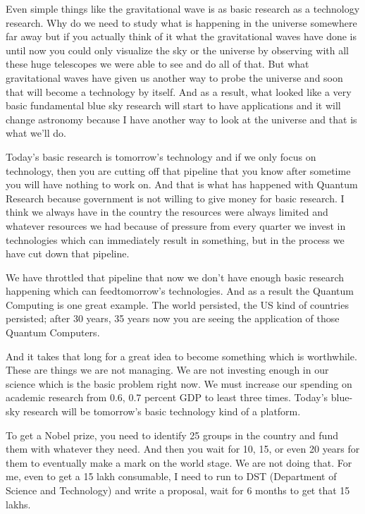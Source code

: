 \begin{multicols}{2}
Even simple things like the gravitational wave is as basic research as a technology research. Why do we need to study what is happening in the universe somewhere far away but if you actually think of it what the gravitational waves have done is until now you could only visualize the sky or the universe by observing with all these huge telescopes we were able to see and do all of that. But what gravitational waves have given us another way to probe the universe and soon that will become a technology by itself. And as a result, what looked like a very basic fundamental blue sky research will start to have applications and it will change astronomy because I have another way to look at the universe and that is what we’ll do.

Today’s basic research is tomorrow’s technology and if we only focus on technology, then you are cutting off that pipeline that you know after sometime you will have nothing to work on. And that is what has happened with Quantum Research because government is not willing to give money for basic research. I think we always have in the country the resources were always limited and whatever resources we had because of pressure from every quarter we invest in technologies which can immediately result in something, but in the process we have cut down that pipeline.

We have throttled that pipeline that now we don’t have enough basic research happening which can feed\break tomorrow’s technologies. And as a result the Quantum Computing is one great example. The world persisted, the US kind of countries persisted; after 30 years, 35 years now you are seeing the application of those Quantum Computers.

And it takes that long for a great idea to become something which is worthwhile. These are things we are not managing. We are not investing enough in our science which is the basic problem right now. We must increase our spending on academic research from 0.6, 0.7 percent GDP to least three times. Today’s blue-sky research will be tomorrow’s basic technology kind of a platform.

To get a Nobel prize, you need to identify 25 groups in the country and fund them with whatever they need. And then you wait for 10, 15, or even 20 years for them to eventually make a mark on the world stage. We are not doing that. For me, even to get a 15 lakh consumable, I need to run to DST (Department of Science and Technology) and write a proposal, wait for 6 months to get that 15 lakhs.


\end{multicols}
